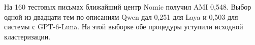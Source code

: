 На 160 тестовых письмах ближайший центр Nomic получил AMI 0,548. Выбор одной из двадцати тем по описаниям Qwen дал 0,251 для Laya и 0,503 для системы с GPT-6-Luna. На этой выборке обе процедуры уступили исходной кластеризации.
